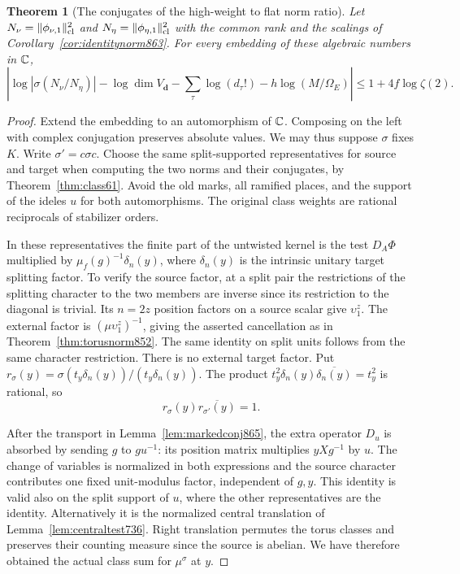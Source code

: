 \documentclass[a4paper,11pt]{article}
\newtheorem{theorem}[proposition]{Theorem}
\theoremstyle{definition}
\theoremstyle{remark}
\numberwithin{equation}{section}
\begin{document}
\begin{theorem}[The conjugates of the high-weight to flat norm ratio]
\leavevmode\label{thm:allnorm865}
Let \(N_\nu=\|\phi_{\nu,1}\|_{\rm cl}^2\) and
\(N_\eta=\|\phi_{\eta,1}\|_{\rm cl}^2\) with the common
rank and the scalings of Corollary~\ref{cor:identitynorm863}.
For every embedding of these algebraic numbers in \(\mathbb C\),
\begin{equation}
 \left|\log|\sigma(N_\nu/N_\eta)|
   -\log\dim V_{\mathbf d}
   -\sum_\tau\log(d_\tau!)
   -h\log(M/\Omega_E)\right|
                   \le 1+4f\log\zeta(2).
 \label{eq:allnorm865}
\end{equation}
\end{theorem}
\begin{proof}
Extend the embedding to an automorphism of \(\mathbb C\).
Composing on the left with complex conjugation preserves
absolute values. We may thus suppose \(\sigma\) fixes \(K\).
Write \(\sigma'=c\sigma c\). Choose the same split-supported
representatives for source and target when computing the two
norms and their conjugates, by Theorem~\ref{thm:class61}.
Avoid the old marks, all ramified places, and the support of
the ideles \(u\) for both automorphisms. The original class
weights are rational reciprocals of stabilizer orders.

In these representatives the finite part of the untwisted
kernel is the test \(D_A\Phi\) multiplied by
\(\mu_f(g)^{-1}\delta_n(y)\), where \(\delta_n(y)\) is the
intrinsic unitary target splitting factor. To verify the source
factor, at a split pair the restrictions of the splitting
character to the two members are inverse since its restriction
to the diagonal is trivial. Its \(n=2z\) position factors on a
source scalar give \(\upsilon_1^z\). The external factor is
\((\mu\upsilon_1^z)^{-1}\), giving the asserted cancellation
as in Theorem~\ref{thm:torusnorm852}. The same identity on
split units follows from the same character restriction.
There is no external target factor. Put
\(r_\sigma(y)=\sigma(t_y\delta_n(y))/(t_y\delta_n(y))\).
The product \(t_y^2\delta_n(y)\overline{\delta_n(y)}=t_y^2\)
is rational, so
\begin{equation}
                 r_\sigma(y)\overline{r_{\sigma'}(y)}=1 .
 \label{eq:targetcancel865}
\end{equation}

After the transport in Lemma~\ref{lem:markedconj865}, the extra
operator \(D_u\) is absorbed by sending \(g\) to \(g u^{-1}\):
its position matrix multiplies \(yXg^{-1}\) by \(u\). The
change of variables is normalized in both expressions and
the source character contributes one fixed unit-modulus
factor, independent of \(g,y\). This identity is valid also
on the split support of \(u\), where the other representatives
are the identity. Alternatively it is the normalized central
translation of Lemma~\ref{lem:centraltest736}. Right translation
permutes the torus classes and preserves their counting measure
since the source is abelian. We have therefore obtained the
actual class sum for \(\mu^\sigma\) at \(y\).


\end{proof}
\end{document}
